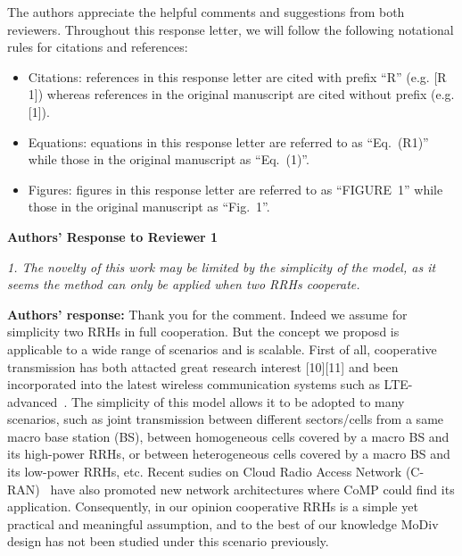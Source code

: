 \documentclass[onecolumn, 11pt, draftclsnofoot]{IEEEtran}
\begin{document}
The authors appreciate the helpful comments and suggestions from both reviewers. 
Throughout this response letter, we will follow the following notational
rules for citations and references:
\begin{itemize}
  \item Citations: references in this response letter are cited with prefix
  ``R'' (e.g. [R 1]) whereas references in the original manuscript are cited
  without prefix (e.g. [1]).
  \item Equations: equations in this response letter are referred to as
  ``Eq.~(R1)''  while those in the original manuscript as ``Eq.~(1)''.
  \item Figures: figures in this response letter are referred to as
  ``FIGURE~1''  while those in the original manuscript as ``Fig.~1''.
\end{itemize}

\begin{center}
  {\LARGE \textbf{Authors' Response to Reviewer 1}}
\end{center}


 
\noindent
\emph{1. The novelty of this work may be limited by the simplicity of the model,
as it seems the method can only be applied when two RRHs cooperate. }

\noindent \textbf{Authors' response:} 
Thank you for the comment. Indeed we assume for simplicity two RRHs in full
cooperation. But the concept we proposd is applicable to a wide range of
scenarios and is scalable. First of all, cooperative transmission has both
attacted great research interest [10][11] and been incorporated into the latest
wireless communication systems such as LTE-advanced~\citep[R][]{TR36.819}. The
simplicity of this model allows it to be adopted to many scenarios, such as
joint transmission between different sectors/cells from a same macro base
station (BS), between homogeneous cells covered by a macro BS and its high-power RRHs, or between heterogeneous cells covered by a macro BS and its low-power RRHs, etc. Recent sudies on Cloud Radio Access Network
(C-RAN)~\citep[R][]{6897914}\citep[R][]{6923535} have also promoted new network architectures where CoMP could find its application.
Consequently, in our opinion cooperative RRHs is a simple yet practical and
meaningful assumption, and to the best of our knowledge MoDiv design has not
been studied under this scenario previously.
\end{document}
